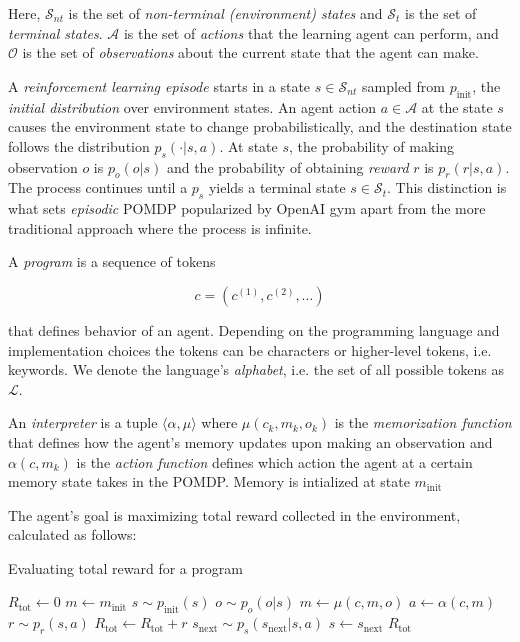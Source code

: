 Here, $\mathcal{S}_{nt}$ is the set of {\em non-terminal (environment) states} and $\mathcal{S}_{t}$ is the set of {\em terminal states}. 
$\mathcal{A}$ is the set of {\em actions} that the learning agent can perform, and $\mathcal{O}$ is the set of {\em observations} about the current state that the agent can make. 

A \emph{reinforcement learning episode} starts in a state $s \in \mathcal{S}_{nt}$ sampled from $p_\text{init}$, the {\em initial distribution} over environment states.
An agent action $a \in \mathcal{A}$ at the state $s$ causes the environment state to change probabilistically, and the destination state follows the distribution $p_s(\cdot | s, a)$. 
At state $s$, the probability of making observation $o$ is $p_o(o | s)$ and the probability of obtaining \emph{reward} $r$ is $p_r(r|s,a)$. 
The process continues until a $p_s$ yields a terminal state $s \in \mathcal{S}_t$.
This distinction is what sets \emph{episodic} POMDP popularized by OpenAI gym \cite{openai-gym} apart from the more traditional approach \cite{kramerjdavidrPartiallyObservableMarkov1964, spaanPartiallyObservableMarkov2012} where the process is infinite.

A \emph{program} is a sequence of tokens

\begin{equation}
    c=(c^{(1)},c^{(2)},\dots)
\end{equation}

that defines behavior of an agent.
Depending on the programming language and implementation choices the tokens can be characters or higher-level tokens, i.e. keywords.
We denote the language's \emph{alphabet}, i.e. the set of all possible tokens as $\mathcal{L}$.

An \emph{interpreter} is a tuple $\langle \alpha,\mu \rangle$ where $\mu(c_k,m_k,o_k)$ is the \emph{memorization function} that defines how the agent's memory updates upon making an observation and $\alpha(c, m_k)$ is the \emph{action function} defines which action the agent at a certain memory state takes in the POMDP.
Memory is intialized at state $m_\text{init}$

The agent's goal is maximizing total reward collected in the environment, calculated as follows:

\begin{algorithm}[H]
\begin{algorithmic}[1]
\caption{Evaluating total reward for a program}
\State $R_\text{tot} \gets 0$
\State $m \gets m_\text{init}$
\State $s \sim p_\text{init}(s)$
\State $o \sim p_o(o | s)$
\State $m \gets \mu(c,m,o)$
\State $a \gets \alpha(c, m)$ 
\State $r \sim p_r(s,a)$
\State $R_\text{tot} \gets R_\text{tot} + r$
\State $s_\text{next} \sim p_s(s_\text{next} | s, a)$
\State $s\gets s_\text{next}$
\EndWhile
\State \Return $R_\text{tot}$
\EndFunction
\end{algorithmic}
\end{algorithm}

